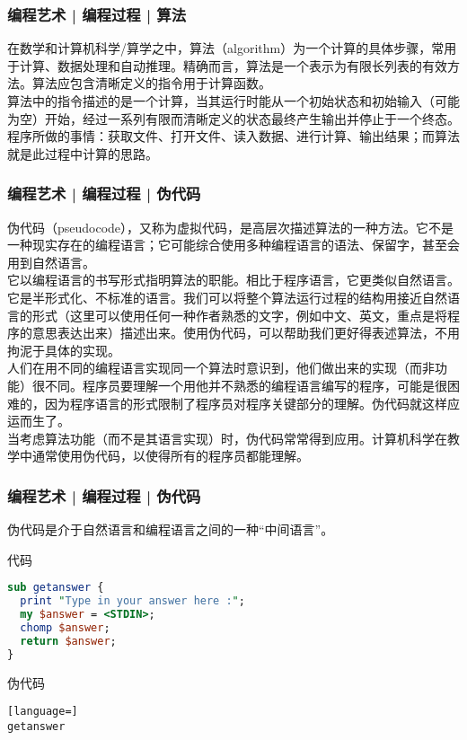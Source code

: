 \begin{frame}
  \frametitle{编程艺术 | 编程过程 | 算法}
  在数学和计算机科学/算学之中，算法（algorithm）为一个\alert{计算的具体步骤}，常用于计算、数据处理和自动推理。精确而言，算法是一个表示为有限长列表的有效方法。算法应包含清晰定义的指令用于计算函数。\\
  \vspace{1em}
  算法中的指令描述的是一个计算，当其运行时能从一个初始状态和初始输入（可能为空）开始，经过一系列有限而清晰定义的状态最终产生输出并停止于一个终态。\\
  \vspace{1em}
  程序所做的事情：获取文件、打开文件、读入数据、进行计算、输出结果；而算法就是此过程中\alert{计算的思路}。
\end{frame}

\begin{frame}
  \frametitle{编程艺术 | 编程过程 | 伪代码}
伪代码（pseudocode），又称为虚拟代码，是高层次描述算法的一种方法。它不是一种现实存在的编程语言；它可能综合使用多种编程语言的语法、保留字，甚至会用到自然语言。\\
  \vspace{0.8em}
它以编程语言的书写形式指明算法的职能。相比于程序语言，它更类似自然语言。它是半形式化、不标准的语言。我们可以将整个算法运行过程的结构用接近自然语言的形式（这里可以使用任何一种作者熟悉的文字，例如中文、英文，重点是将程序的意思表达出来）描述出来。使用伪代码，可以帮助我们更好得表述算法，不用拘泥于具体的实现。\\
  \vspace{0.8em}
人们在用不同的编程语言实现同一个算法时意识到，他们做出来的实现（而非功能）很不同。程序员要理解一个用他并不熟悉的编程语言编写的程序，可能是很困难的，因为程序语言的形式限制了程序员对程序关键部分的理解。伪代码就这样应运而生了。\\
  \vspace{0.8em}
  当考虑算法功能（而不是其语言实现）时，伪代码常常得到应用。计算机科学在教学中通常使用伪代码，以使得所有的程序员都能理解。
\end{frame}

\begin{frame}[fragile]
  \frametitle{编程艺术 | 编程过程 | 伪代码}
伪代码是介于自然语言和编程语言之间的一种“中间语言”。
  \begin{block}{代码}
\begin{lstlisting}[language=Perl]
sub getanswer {
  print "Type in your answer here :";  
  my $answer = <STDIN>;
  chomp $answer;
  return $answer;
}
\end{lstlisting}
\end{block}
\pause
\begin{block}{伪代码}
\begin{lstlisting}[language=]
getanswer
\end{lstlisting}
\end{block}
\end{frame}

